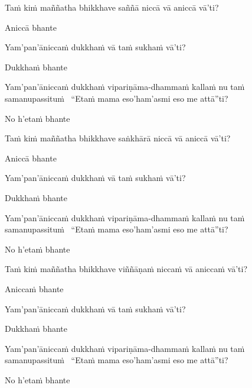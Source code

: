 \begin{pali-hang}
  Taṁ kiṁ maññatha bhikkhave saññā niccā vā aniccā vā'ti?
\end{pali-hang}
\begin{pali-hangtogether}
  Aniccā bhante
\end{pali-hangtogether}
\begin{pali-hangtogether}
  Yam'pan'āniccaṁ dukkhaṁ vā taṁ sukhaṁ vā'ti?
\end{pali-hangtogether}
\begin{pali-hangtogether}
  Dukkhaṁ bhante
\end{pali-hangtogether}
\begin{pali-hangtogether}
  Yam'pan'āniccaṁ dukkhaṁ vipariṇāma-dhammaṁ kallaṁ nu taṁ samanupassituṁ \breathmark\ ``Etaṁ mama eso'ham'asmi eso me attā''ti?
\end{pali-hangtogether}
\begin{pali-hangtogether}
  No h'etaṁ bhante
\end{pali-hangtogether}

\begin{pali-hang}
  Taṁ kiṁ maññatha bhikkhave saṅkhārā niccā vā aniccā vā'ti?
\end{pali-hang}
\begin{pali-hangtogether}
  Aniccā bhante
\end{pali-hangtogether}
\begin{pali-hangtogether}
  Yam'pan'āniccaṁ dukkhaṁ vā taṁ sukhaṁ vā'ti?
\end{pali-hangtogether}
\begin{pali-hangtogether}
  Dukkhaṁ bhante
\end{pali-hangtogether}
\begin{pali-hangtogether}
  Yam'pan'āniccaṁ dukkhaṁ vipariṇāma-dhammaṁ kallaṁ nu taṁ samanupassituṁ \breathmark\ ``Etaṁ mama eso'ham'asmi eso me attā''ti?
\end{pali-hangtogether}
\begin{pali-hangtogether}
  No h'etaṁ bhante
\end{pali-hangtogether}

\begin{pali-hang}
  Taṁ kiṁ maññatha bhikkhave viññāṇaṁ niccaṁ vā aniccaṁ vā'ti?
\end{pali-hang}
\begin{pali-hangtogether}
  Aniccaṁ bhante
\end{pali-hangtogether}
\begin{pali-hangtogether}
  Yam'pan'āniccaṁ dukkhaṁ vā taṁ sukhaṁ vā'ti?
\end{pali-hangtogether}
\begin{pali-hangtogether}
  Dukkhaṁ bhante
\end{pali-hangtogether}
\begin{pali-hangtogether}
  Yam'pan'āniccaṁ dukkhaṁ vipariṇāma-dhammaṁ kallaṁ nu taṁ samanupassituṁ \breathmark\ ``Etaṁ mama eso'ham'asmi eso me attā''ti?
\end{pali-hangtogether}
\begin{pali-hangtogether}
  No h'etaṁ bhante
\end{pali-hangtogether}

